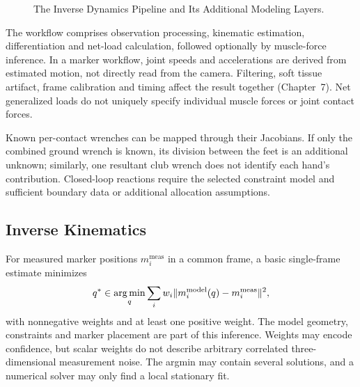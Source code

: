 \begin{figure}[htbp]
\centering
{}
\caption{The Inverse Dynamics Pipeline and Its Additional Modeling Layers.}
\label{fig:ch6:id-pipeline}
\end{figure}

The workflow comprises observation processing, kinematic estimation,
differentiation and net-load calculation, followed optionally by muscle-force
inference. In a marker workflow, joint speeds and accelerations are derived
from estimated motion, not directly read from the camera.
Filtering, soft tissue artifact, frame calibration and timing affect the
result together (Chapter~7). Net generalized loads do not uniquely specify
individual muscle forces or joint contact forces.

Known per-contact wrenches can be mapped through their Jacobians. If only the
combined ground wrench is known, its division between the feet is an additional
unknown; similarly, one resultant club wrench does not identify each hand's
contribution. Closed-loop reactions require the selected constraint model and
sufficient boundary data or additional allocation assumptions.

\subsection{Inverse Kinematics}

For measured marker positions $m_i^{\mathrm{meas}}$ in a common frame, a basic
single-frame estimate minimizes
\begin{equation}
 q^*\in\operatorname*{arg\,min}_q\sum_i w_i
 \lVert m_i^{\mathrm{model}}(q)-m_i^{\mathrm{meas}}\rVert^2,
 \label{eq:ch6:ik-optimization}
\end{equation}
with nonnegative weights and at least one positive weight.
The model geometry, constraints and marker placement are part of this inference.
Weights may encode confidence, but scalar weights do not describe arbitrary
correlated three-dimensional measurement noise.
The argmin may contain several solutions, and a numerical solver may only
find a local stationary fit.

